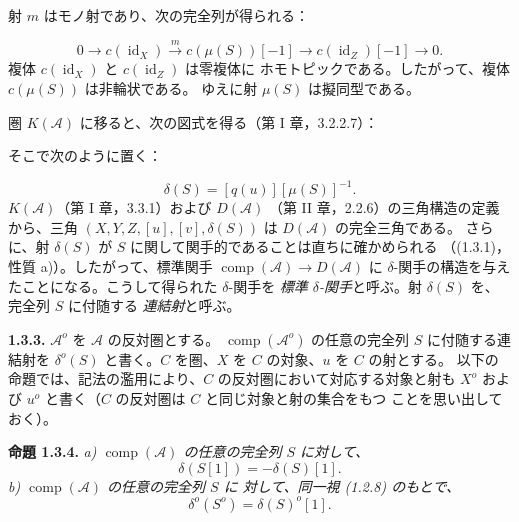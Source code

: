 \clearpage
{}%
\begingroup\small\setlength{\parskip}{0pt}\setlength{\emergencystretch}{1.5em}
\setlength{\abovedisplayskip}{4pt plus 2pt minus 2pt}%
\setlength{\belowdisplayskip}{4pt plus 2pt minus 2pt}%

射 $m$ はモノ射であり、次の完全列が得られる：

\begin{equation}
0\longrightarrow c(\operatorname{id}_X)
\xrightarrow{m}c(\mu(S))[-1]
\longrightarrow c(\operatorname{id}_Z)[-1]
\longrightarrow0.
\tag{1.3.2.3}
\end{equation}
複体 $c(\operatorname{id}_X)$ と $c(\operatorname{id}_Z)$ は零複体に
ホモトピックである。したがって、複体 $c(\mu(S))$ は非輪状である。
ゆえに射 $\mu(S)$ は擬同型である。

圏 $K(\mathcal A)$ に移ると、次の図式を得る（第 I 章，3.2.2.7）：
\begin{center}
\end{center}
そこで次のように置く：

\begin{equation}
\delta(S)=[q(u)][\mu(S)]^{-1}.
\tag{1.3.2.4}
\end{equation}
$K(\mathcal A)$（第 I 章，3.3.1）および $D(\mathcal A)$
（第 II 章，2.2.6）の三角構造の定義から、三角
$(X,Y,Z,[u],[v],\delta(S))$ は $D(\mathcal A)$ の完全三角である。
さらに、射 $\delta(S)$ が $S$ に関して関手的であることは直ちに確かめられる
（(1.3.1)，性質 a)）。したがって、標準関手
$\operatorname{comp}(\mathcal A)\longrightarrow D(\mathcal A)$ に
$\delta$-関手の構造を与えたことになる。こうして得られた $\delta$-関手を
\emph{標準 $\delta$-関手}と呼ぶ。射 $\delta(S)$ を、完全列 $S$ に付随する
\emph{連結射}と呼ぶ。

\medskip\noindent\textbf{1.3.3.}\quad
$\mathcal A^o$ を $\mathcal A$ の反対圏とする。
$\operatorname{comp}(\mathcal A^o)$ の任意の完全列 $S$ に付随する連結射を
$\delta^o(S)$ と書く。$C$ を圏、$X$ を $C$ の対象、$u$ を $C$ の射とする。
以下の命題では、記法の濫用により、$C$ の反対圏において対応する対象と射も
$X^o$ および $u^o$ と書く（$C$ の反対圏は $C$ と同じ対象と射の集合をもつ
ことを思い出しておく）。

\medskip\noindent\textbf{命題 1.3.4.}\quad
\textit{a) $\operatorname{comp}(\mathcal A)$ の任意の完全列 $S$ に対して、}
\[
\delta(S[1])=-\delta(S)[1].
\]
\noindent\textit{b) $\operatorname{comp}(\mathcal A)$ の任意の完全列 $S$ に
対して、同一視 (1.2.8) のもとで、}
\[
\delta^o(S^o)=\delta(S)^o[1].
\]
\endgroup
